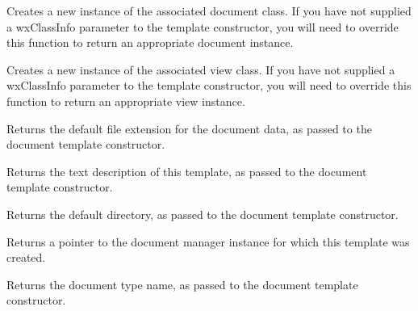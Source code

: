 

Creates a new instance of the associated document class. If you have not supplied
a wxClassInfo parameter to the template constructor, you will need to override this
function to return an appropriate document instance.



Creates a new instance of the associated view class. If you have not supplied
a wxClassInfo parameter to the template constructor, you will need to override this
function to return an appropriate view instance.



Returns the default file extension for the document data, as passed to the document template constructor.



Returns the text description of this template, as passed to the document template constructor.



Returns the default directory, as passed to the document template constructor.



Returns a pointer to the document manager instance for which this template was created.



Returns the document type name, as passed to the document template constructor.



